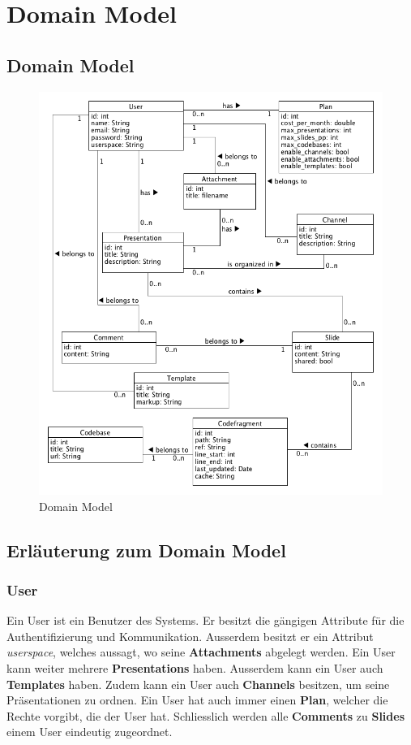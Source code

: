 \chapter{Domain Model}
\label{chap:domainmodel}
\section{Domain Model}
\begin{figure}[H]
	\centering
    \includegraphics[width=1\textwidth]{images/domain-model.png}
    \caption{Domain Model}
\end{figure}

\section{Erläuterung zum Domain Model}


\subsection{User}
Ein User ist ein Benutzer des Systems. Er besitzt die gängigen Attribute für die Authentifizierung und Kommunikation. Ausserdem besitzt er ein Attribut \emph{userspace}, welches aussagt, wo seine \textbf{Attachments} abgelegt werden. Ein User kann weiter mehrere \textbf{Presentations} haben. Ausserdem kann ein User auch \textbf{Templates} haben. Zudem kann ein User auch \textbf{Channels} besitzen, um seine Präsentationen zu ordnen. Ein User hat auch immer einen \textbf{Plan}, welcher die Rechte vorgibt, die der User hat. Schliesslich werden alle \textbf{Comments} zu \textbf{Slides} einem User eindeutig zugeordnet.

